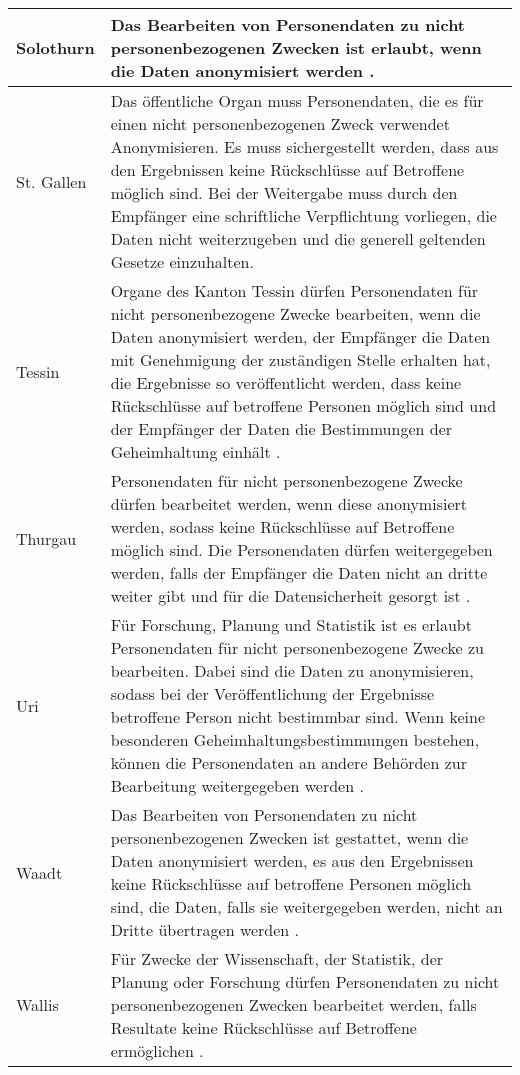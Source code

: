 \begin{longtable}{| p{} | p{}|}
		\hline
		Solothurn & Das Bearbeiten von Personendaten zu nicht personenbezogenen Zwecken ist erlaubt, wenn die Daten anonymisiert werden \parencite[§§ 16 Abs 3]{DSSGSO}. \\
    \hline
		St. Gallen & Das öffentliche Organ muss Personendaten, die es für einen nicht personenbezogenen Zweck verwendet Anonymisieren. Es muss sichergestellt werden, dass aus den Ergebnissen keine Rückschlüsse auf Betroffene möglich sind. Bei der Weitergabe muss durch den Empfänger eine schriftliche Verpflichtung vorliegen, die Daten nicht weiterzugeben und die generell geltenden Gesetze einzuhalten\parencite[§§ 7 Abs 1-3]{DSSGSG}. \\
		\hline
		Tessin & Organe des Kanton Tessin dürfen Personendaten für nicht personenbezogene Zwecke bearbeiten, wenn die Daten anonymisiert werden, der Empfänger die Daten mit Genehmigung der zuständigen Stelle erhalten hat, die Ergebnisse so veröffentlicht werden, dass keine Rückschlüsse auf betroffene Personen möglich sind und der Empfänger der Daten die Bestimmungen der Geheimhaltung einhält \parencite[§§ 15 Abs 1-2]{DSSGTI}. \\
		\hline
		Thurgau & Personendaten für nicht personenbezogene Zwecke dürfen bearbeitet werden, wenn diese anonymisiert werden, sodass keine Rückschlüsse auf Betroffene möglich sind. Die Personendaten dürfen  weitergegeben werden, falls der Empfänger die Daten nicht an dritte weiter gibt und für die Datensicherheit gesorgt ist \parencite[§§ 11 Abs 1-3]{DSSGTG}. \\
		\hline
		Uri & Für Forschung, Planung und Statistik ist es erlaubt Personendaten für nicht personenbezogene Zwecke zu bearbeiten. Dabei sind die Daten zu anonymisieren, sodass bei der Veröffentlichung der Ergebnisse betroffene Person nicht bestimmbar sind. Wenn keine besonderen Geheimhaltungsbestimmungen bestehen, können die Personendaten an andere Behörden zur Bearbeitung weitergegeben werden \parencite[§§ 10 Abs. 1-2]{DSSGUR}. \\
		\hline
    Waadt & Das Bearbeiten von Personendaten zu nicht personenbezogenen Zwecken ist gestattet, wenn die Daten anonymisiert werden, es aus den Ergebnissen keine Rückschlüsse auf betroffene Personen möglich sind, die Daten, falls sie weitergegeben werden, nicht an Dritte übertragen werden \parencite[§§ 24 Abs 1-3]{DSSGVD}. \\
		\hline
    Wallis & Für Zwecke der Wissenschaft, der Statistik, der Planung oder Forschung dürfen Personendaten zu nicht personenbezogenen Zwecken bearbeitet werden, falls Resultate keine Rückschlüsse auf Betroffene ermöglichen \parencite[§§ 26 Abs. 1]{DSSGVS}.  \\

\end{longtable}
